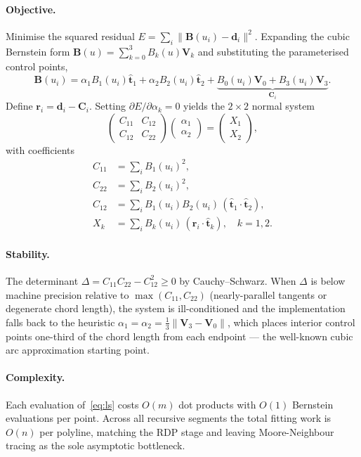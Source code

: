 \documentclass[twocolumn,a4paper,10pt]{article}
\begin{document}
\paragraph*{Objective.}
Minimise the squared residual
$E = \sum_{i}\|\mathbf{B}(u_i)-\mathbf{d}_i\|^2$.
Expanding the cubic Bernstein form
$\mathbf{B}(u)=\sum_{k=0}^{3}B_k(u)\mathbf{V}_k$ and substituting
the parameterised control points,
\[
\mathbf{B}(u_i)
   = \alpha_1 B_1(u_i)\hat{\mathbf{t}}_1
   + \alpha_2 B_2(u_i)\hat{\mathbf{t}}_2
   + \underbrace{B_0(u_i)\mathbf{V}_0 + B_3(u_i)\mathbf{V}_3}_{\mathbf{C}_i}.
\]
Define $\mathbf{r}_i = \mathbf{d}_i - \mathbf{C}_i$.  Setting
$\partial E/\partial\alpha_k=0$ yields the $2\!\times\!2$ normal system
\begin{equation}
\begin{pmatrix} C_{11} & C_{12} \\ C_{12} & C_{22} \end{pmatrix}
\!\begin{pmatrix} \alpha_1 \\ \alpha_2 \end{pmatrix}
=
\begin{pmatrix} X_1 \\ X_2 \end{pmatrix},
\label{eq:ls}
\end{equation}
with coefficients
\begin{align*}
C_{11} &= \textstyle\sum_i B_1(u_i)^2, \\
C_{22} &= \textstyle\sum_i B_2(u_i)^2, \\
C_{12} &= \textstyle\sum_i B_1(u_i)B_2(u_i)\,
                    (\hat{\mathbf{t}}_1\cdot\hat{\mathbf{t}}_2), \\
X_k    &= \textstyle\sum_i B_k(u_i)\,(\mathbf{r}_i\cdot\hat{\mathbf{t}}_k),
          \quad k=1,2.
\end{align*}

\paragraph*{Stability.}
The determinant $\Delta = C_{11}C_{22}-C_{12}^2\ge 0$ by
Cauchy--Schwarz.  When $\Delta$ is below machine precision relative to
$\max(C_{11},C_{22})$ (nearly-parallel tangents or degenerate chord
length), the system is ill-conditioned and the implementation falls
back to the heuristic
$\alpha_1=\alpha_2=\tfrac{1}{3}\|\mathbf{V}_3-\mathbf{V}_0\|$, which
places interior control points one-third of the chord length from each
endpoint --- the well-known cubic arc approximation starting point.

\paragraph*{Complexity.}
Each evaluation of~\eqref{eq:ls} costs $O(m)$ dot products with $O(1)$
Bernstein evaluations per point.  Across all recursive segments the
total fitting work is $O(n)$ per polyline, matching the RDP stage
and leaving Moore-Neighbour tracing as the sole asymptotic bottleneck.
\end{document}
